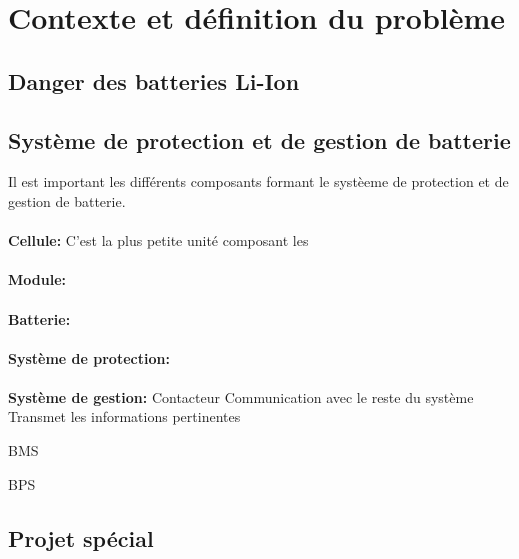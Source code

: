 \section{Contexte et définition du problème}


\subsection{Danger des batteries Li-Ion}

\subsection{Système de protection et de gestion de batterie}

Il est important les différents composants formant le systèeme de protection et de gestion de batterie.

\paragraph{}
\textbf{Cellule:} C'est la plus petite unité composant les 


\paragraph{}
\textbf{Module:} 

\paragraph{}
\textbf{Batterie:} 


\paragraph{}
\textbf{Système de protection:}  


\paragraph{}
\textbf{Système de gestion:} 
Contacteur
Communication avec le reste du système
Transmet les informations pertinentes




BMS

BPS

\subsection{Projet spécial}

